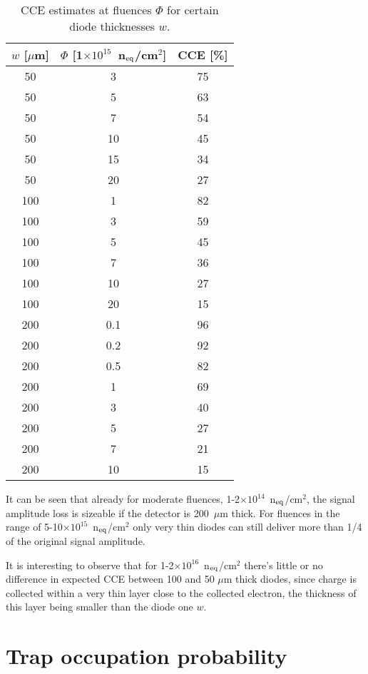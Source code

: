 \begin{table}[!htbp]
\centering
\begin{tabular}{ccc}
\hline
$w$ [$\mu$m] & $\Phi$ [1$\times10^{15}$~n$_{\rm eq}$/cm$^2$] & CCE [\%] \\
\hline
\hline
50 & 3 & 75 \\
50 & 5 & 	63 \\
50 & 7 & 54 \\
50 & 	10 & 	45 \\
50 & 15 & 34 \\
50 & 20 & 27\\
\hline
100 & 1 & 82 \\
100 & 3 & 59 \\
100 & 5 & 	45 \\
100 & 7 & 36 \\
100 & 10 & 27 \\
100 & 20 & 15 \\
\hline
200 & 0.1 & 96\\
200 & 0.2 & 92\\
200 & 0.5 & 82\\
200 & 1 & 69 \\
200 & 3 & 40 \\
200 & 5 & 	27 \\
200 & 7 & 21 \\
200 & 10 & 15 \\
\hline
\end{tabular}
\caption{\label{tab:cce_scenarios}CCE estimates at fluences $\Phi$ for 
certain diode thicknesses $w$.}
\end{table}

It can be seen that already for moderate fluences, 1-2$\times10^{14}$~n$_{\rm eq}$/cm$^2$, 
the signal amplitude loss is sizeable if the detector is 200~$\mu$m thick. 
For fluences in the range of 5-10$\times10^{15}$~n$_{\rm eq}$/cm$^2$ only very thin diodes 
can still deliver more than 1/4 of the original signal amplitude. 

It is interesting to observe that for 1-2$\times10^{16}$~n$_{\rm eq}$/cm$^2$ there's little or no 
difference in expected CCE between 100 and 50 $\mu$m thick diodes, since charge is collected 
within a very thin layer close to the collected electron, the thickness of this layer being smaller 
than the diode one $w$.

\chapter{Trap occupation probability}
\label{sec:trapoccprob}

